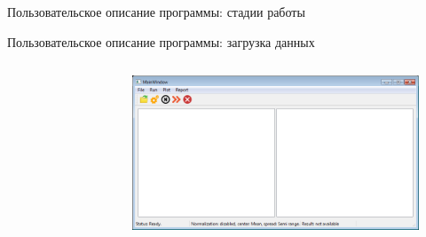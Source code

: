 \documentclass[aspectratio=169,tikz]{beamer}
\begin{document}

	\begin{frame}{Пользовательское описание программы: стадии работы}
		\begin{figure}[T] %
			\centering
			
		\end{figure}
	\end{frame}
	
	
	\begin{frame}{Пользовательское описание программы: загрузка данных}
	\begin{columns}
		\begin{figure}[T] %
			\centering
			
		\end{figure}
		\begin{figure}[T] %
			\centering
			\includegraphics[width=0.95\linewidth]{img/diploma/instruction/empty-window}
		\end{figure}
		
	\end{columns}
	\end{frame}
	
\end{document}
